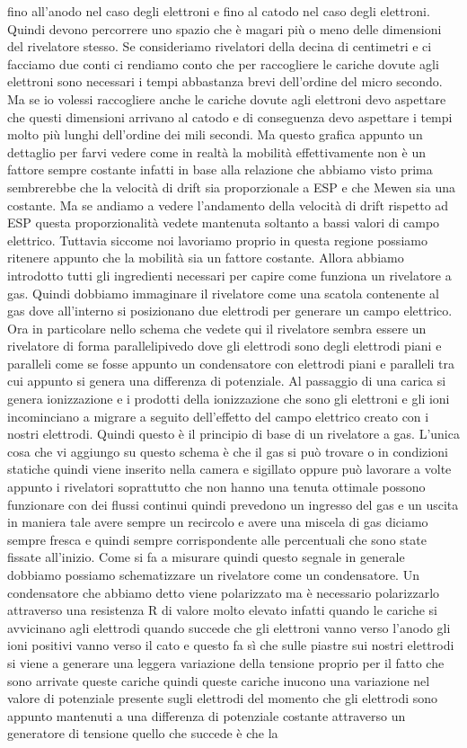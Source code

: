 fino all'anodo nel caso degli elettroni e fino al catodo nel caso degli elettroni. Quindi devono percorrere uno spazio che è magari più o meno delle dimensioni del rivelatore stesso. Se consideriamo rivelatori della decina di centimetri e ci facciamo due conti ci rendiamo conto che per raccogliere le cariche dovute agli elettroni sono necessari i tempi abbastanza brevi dell'ordine del micro secondo. Ma se io volessi raccogliere anche le cariche dovute agli elettroni devo aspettare che questi dimensioni arrivano al catodo e di conseguenza devo aspettare i tempi molto più lunghi dell'ordine dei mili secondi. Ma questo grafica appunto un dettaglio per farvi vedere come in realtà la mobilità effettivamente non è un fattore sempre costante infatti in base alla relazione che abbiamo visto prima sembrerebbe che la velocità di drift sia proporzionale a ESP e che Mewen sia una costante. Ma se andiamo a vedere l'andamento della velocità di drift rispetto ad ESP questa proporzionalità vedete mantenuta soltanto a bassi valori di campo elettrico. Tuttavia siccome noi lavoriamo proprio in questa regione possiamo ritenere appunto che la mobilità sia un fattore costante. Allora abbiamo introdotto tutti gli ingredienti necessari per capire come funziona un rivelatore a gas. Quindi dobbiamo immaginare il rivelatore come una scatola contenente al gas dove all'interno si posizionano due elettrodi per generare un campo elettrico. Ora in particolare nello schema che vedete qui il rivelatore sembra essere un rivelatore di forma parallelipivedo dove gli elettrodi sono degli elettrodi piani e paralleli come se fosse appunto un condensatore con elettrodi piani e paralleli tra cui appunto si genera una differenza di potenziale. Al passaggio di una carica si genera ionizzazione e i prodotti della ionizzazione che sono gli elettroni e gli ioni incominciano a migrare a seguito dell'effetto del campo elettrico creato con i nostri elettrodi. Quindi questo è il principio di base di un rivelatore a gas. L'unica cosa che vi aggiungo su questo schema è che il gas si può trovare o in condizioni statiche quindi viene inserito nella camera e sigillato oppure può lavorare a volte appunto i rivelatori soprattutto che non hanno una tenuta ottimale possono funzionare con dei flussi continui quindi prevedono un ingresso del gas e un uscita in maniera tale avere sempre un recircolo e avere una miscela di gas diciamo sempre fresca e quindi sempre corrispondente alle percentuali che sono state fissate all'inizio. Come si fa a misurare quindi questo segnale in generale dobbiamo possiamo schematizzare un rivelatore come un condensatore. Un condensatore che abbiamo detto viene polarizzato ma è necessario polarizzarlo attraverso una resistenza R di valore molto elevato infatti quando le cariche si avvicinano agli elettrodi quando succede che gli elettroni vanno verso l'anodo gli ioni positivi vanno verso il cato e questo fa sì che sulle piastre sui nostri elettrodi si viene a generare una leggera variazione della tensione proprio per il fatto che sono arrivate queste cariche quindi queste cariche inucono una variazione nel valore di potenziale presente sugli elettrodi del momento che gli elettrodi sono appunto mantenuti a una differenza di potenziale costante attraverso un generatore di tensione quello che succede è che la 